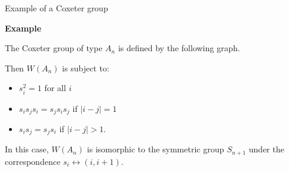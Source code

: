 \documentclass[10pt, compress,aspectratio=169,handout]{beamer}
\begin{document}
\begin{frame}{Example of a Coxeter group}\pause

\vspace{1em}

\begin{block}{\textbf{Example}}

\vspace{-.5em}

The Coxeter group of type $A_n$ is defined by the following graph.
\begin{center}
\end{center}

\vspace{-2em}

\pause Then $W(A_{n})$ is subject to: \pause

\vspace{-.5em}

\begin{itemize}
\item $s_{i}^{2}=1$ for all $i$ \pause
\item $s_{i}s_{j}s_{i}=s_{j}s_{i}s_{j}$ if $|i-j|=1$ \pause 
\item $s_{i}s_{j}=s_{j}s_{i}$ if $|i-j|>1$.
\end{itemize}

\pause

In this case, $W(A_n)$ is isomorphic to the symmetric group $S_{n+1}$ under the correspondence $s_i \leftrightarrow (i, i+1)$.
\end{block}

\end{frame}

\end{document}
